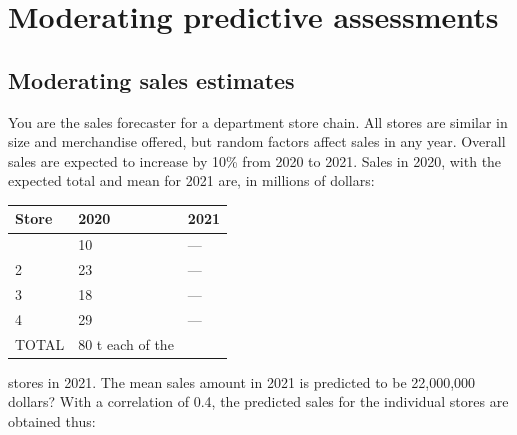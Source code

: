\documentclass[
  10pt,
  b5paper]{book}
\begin{document}
\hypertarget{moderating-predictive-assessments}{%
\section{Moderating predictive assessments}\label{moderating-predictive-assessments}}

\hypertarget{moderating-sales-estimates}{%
\subsection*{Moderating sales estimates}\label{moderating-sales-estimates}}

You are the sales forecaster for a department store chain. All stores are similar in size and merchandise offered, but random factors affect sales in any year. Overall sales are expected to increase by 10\% from 2020 to 2021. Sales in 2020, with the expected total and mean for 2021 are, in millions of dollars:

\begin{longtable}[]{@{}lll@{}}
\toprule\noalign{}
Store & 2020 & 2021 \\
\midrule\noalign{}
\endhead
\bottomrule\noalign{}
\endlastfoot
1 & 10 & --- \\
2 & 23 & --- \\
3 & 18 & --- \\
4 & 29 & --- \\
TOTAL & 80 t each of the & \\
\end{longtable}

stores in 2021. The mean sales amount in 2021 is predicted to be 22,000,000 dollars? With a correlation of 0.4, the predicted sales for the individual stores are obtained thus:
\end{document}
